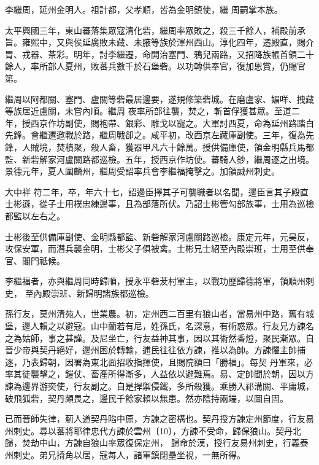 \begin{pinyinscope}
 李繼周，延州金明人。祖計都，父孝順，皆為金明鎮使，繼
 周嗣掌本族。



 太平興國三年，東山蕃落集眾寇清化砦，繼周率眾敗之，殺三千餘人，補殿前承旨。雍熙中，又與侯延廣敗未藏、未腋等族於渾州西山。淳化四年，遷殿直，賜介胃、戎器、茶彩。明年，討李繼遷，命開治塞門、鴉兒兩路，又招降族帳首領二十餘人，率所部人夏州，敗蕃兵數千於石堡砦。以功轉供奉官，復加恩賞，仍賜官第。



 繼周以阿都關、塞門、盧關等砦最居邊要，遂規修築砦城。在磨盧家、媚咩、拽藏等族居近盧關，未嘗內順。繼周
 夜率所部往襲，焚之，斬首俘獲甚眾。至道二年，授西京作坊副使，賜袍帶、銀彩、雕戈以寵之。大軍討西夏，命為延州路踏白先鋒。會繼遷邀戰於路，繼周戰卻之。咸平初，改西京左藏庫副使。三年，復為先鋒，人賊境，焚積聚，殺人畜，獲器甲凡六十餘萬。授供備庫使，領金明縣兵馬都監、新砦解家河盧關路都巡檢。五年，授西京作坊使。蕃騎人鈔，繼周逐之出境。景德元年，夏人圍麟州，繼周受詔率兵會李繼福掩擊之。加領誠州刺史。



 大中祥
 符二年，卒，年六十七，詔邊臣擇其子可襲職者以名聞，邊臣言其子殿直士彬遜，從子士用樸忠練邊事，且為部落所伏。乃詔士彬管勾部族事，士用為巡檢都監以左右之。



 士彬後至供備庫副使、金明縣都監、新砦解家河盧關路巡檢。康定元年，元昊反，攻保安軍，而潛兵襲金明，士彬父子俱被禽。士彬兄士紹至內殿崇班，士用至供奉官、閣門祗候。



 李繼福者，亦與繼周同時歸順，授永平砦茇村軍主，以戰功歷歸德將軍，領順州刺史，
 至內殿崇班、新歸明諸族都巡檢。



 孫行友，莫州清苑人，世業農。初，定州西二百里有狼山者，當易州中路，舊有城堡，邊人賴之以避寇。山中蘭若有尼，姓孫氏，名深意，有術惑眾。行友兄方諫名之為姑師，事之甚謹。及尼坐亡，行友益神其事，因以其術然香燈，聚民漸眾。自晉少帝與契丹絕好，邊州困於轉輸，逋民往往依方諫，推以為帥。方諫懼主帥捕逐，乃表歸朝，因署為東北面招收指揮使，且賜院額曰「勝福」。每契
 丹軍來，必率其徒襲擊之，鎧仗、畜產所得漸多，人益依以避難焉。易、定帥聞於朝，因以方諫為邊界游奕使，行友副之。自是捍禦侵鐵，多所殺獲。乘勝入祁溝關、平庸城，破飛狐砦，契丹頗畏之，邊民千餘家賴以無患。然亦陰持兩端，以圖自固。



 已而晉師失律，薊人道契丹陷中原，方諫之密構也。契丹授方諫定州節度，行友易州刺史。尋以蕃將耶律忠代方諫於雲州〔10〕，方諫不受命，歸保狼山。契丹北歸，焚劫中山，方諫自狼山率眾復保定州，
 歸命於漢，授行友易州刺史，行義泰州刺史。弟兄掎角以居，寇每人，諸軍鎮閉壘坐視，一無所得。




\end{pinyinscope}

